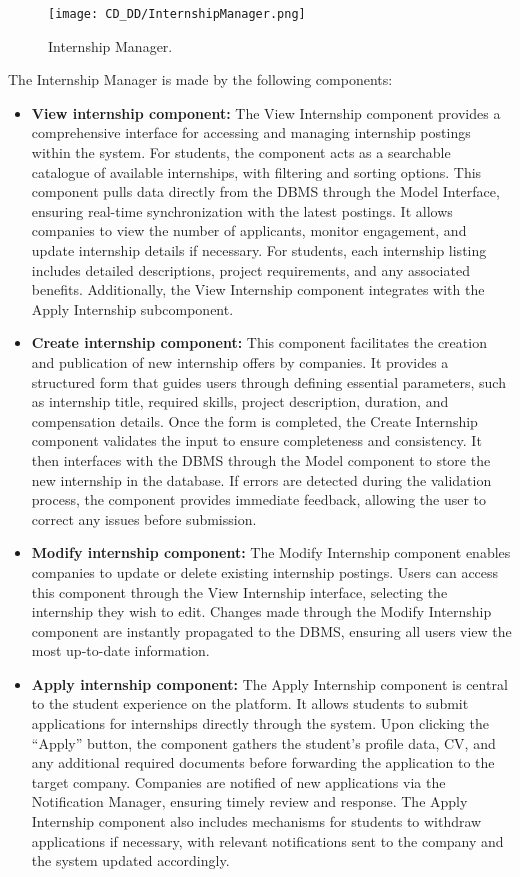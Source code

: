 \begin{figure}[H]
    \begin{center}
        \texttt{[image: CD\_DD/InternshipManager.png]}
        \caption{Internship Manager.}
        \label{fig:internship_manager}%
    \end{center}
\end{figure}

\noindent The Internship Manager is made by the following components:

\begin{itemize}
    \item \textbf{View internship component:} The View Internship component provides a comprehensive interface for accessing and managing internship postings within the system. For students, the component acts as a searchable catalogue of available internships, with filtering and sorting options. This component pulls data directly from the DBMS through the Model Interface, ensuring real-time synchronization with the latest postings. It allows companies to view the number of applicants, monitor engagement, and update internship details if necessary. For students, each internship listing includes detailed descriptions, project requirements, and any associated benefits. Additionally, the View Internship component integrates with the Apply Internship subcomponent.
    \item \textbf{Create internship component:} This component facilitates the creation and publication of new internship offers by companies. It provides a structured form that guides users through defining essential parameters, such as internship title, required skills, project description, duration, and compensation details. Once the form is completed, the Create Internship component validates the input to ensure completeness and consistency. It then interfaces with the DBMS through the Model component to store the new internship in the database. If errors are detected during the validation process, the component provides immediate feedback, allowing the user to correct any issues before submission.
    \item \textbf{Modify internship component:} The Modify Internship component enables companies to update or delete existing internship postings. Users can access this component through the View Internship interface, selecting the internship they wish to edit. Changes made through the Modify Internship component are instantly propagated to the DBMS, ensuring all users view the most up-to-date information. 
    \item \textbf{Apply internship component:} The Apply Internship component is central to the student experience on the platform. It allows students to submit applications for internships directly through the system. Upon clicking the “Apply” button, the component gathers the student’s profile data, CV, and any additional required documents before forwarding the application to the target company. Companies are notified of new applications via the Notification Manager, ensuring timely review and response. The Apply Internship component also includes mechanisms for students to withdraw applications if necessary, with relevant notifications sent to the company and the system updated accordingly.

\end{itemize}
